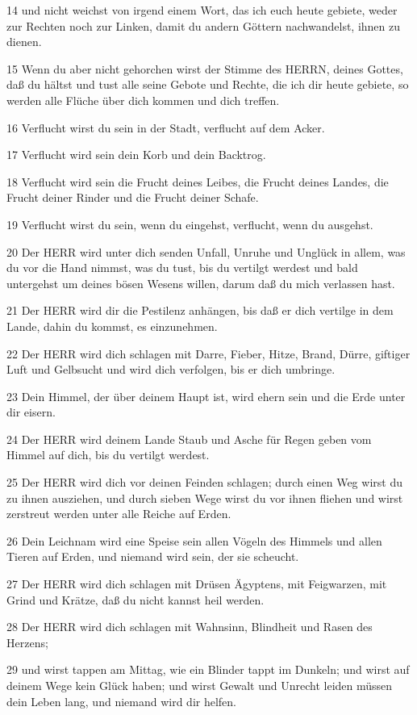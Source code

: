 \par 14 und nicht weichst von irgend einem Wort, das ich euch heute gebiete, weder zur Rechten noch zur Linken, damit du andern Göttern nachwandelst, ihnen zu dienen.
\par 15 Wenn du aber nicht gehorchen wirst der Stimme des HERRN, deines Gottes, daß du hältst und tust alle seine Gebote und Rechte, die ich dir heute gebiete, so werden alle Flüche über dich kommen und dich treffen.
\par 16 Verflucht wirst du sein in der Stadt, verflucht auf dem Acker.
\par 17 Verflucht wird sein dein Korb und dein Backtrog.
\par 18 Verflucht wird sein die Frucht deines Leibes, die Frucht deines Landes, die Frucht deiner Rinder und die Frucht deiner Schafe.
\par 19 Verflucht wirst du sein, wenn du eingehst, verflucht, wenn du ausgehst.
\par 20 Der HERR wird unter dich senden Unfall, Unruhe und Unglück in allem, was du vor die Hand nimmst, was du tust, bis du vertilgt werdest und bald untergehst um deines bösen Wesens willen, darum daß du mich verlassen hast.
\par 21 Der HERR wird dir die Pestilenz anhängen, bis daß er dich vertilge in dem Lande, dahin du kommst, es einzunehmen.
\par 22 Der HERR wird dich schlagen mit Darre, Fieber, Hitze, Brand, Dürre, giftiger Luft und Gelbsucht und wird dich verfolgen, bis er dich umbringe.
\par 23 Dein Himmel, der über deinem Haupt ist, wird ehern sein und die Erde unter dir eisern.
\par 24 Der HERR wird deinem Lande Staub und Asche für Regen geben vom Himmel auf dich, bis du vertilgt werdest.
\par 25 Der HERR wird dich vor deinen Feinden schlagen; durch einen Weg wirst du zu ihnen ausziehen, und durch sieben Wege wirst du vor ihnen fliehen und wirst zerstreut werden unter alle Reiche auf Erden.
\par 26 Dein Leichnam wird eine Speise sein allen Vögeln des Himmels und allen Tieren auf Erden, und niemand wird sein, der sie scheucht.
\par 27 Der HERR wird dich schlagen mit Drüsen Ägyptens, mit Feigwarzen, mit Grind und Krätze, daß du nicht kannst heil werden.
\par 28 Der HERR wird dich schlagen mit Wahnsinn, Blindheit und Rasen des Herzens;
\par 29 und wirst tappen am Mittag, wie ein Blinder tappt im Dunkeln; und wirst auf deinem Wege kein Glück haben; und wirst Gewalt und Unrecht leiden müssen dein Leben lang, und niemand wird dir helfen.
